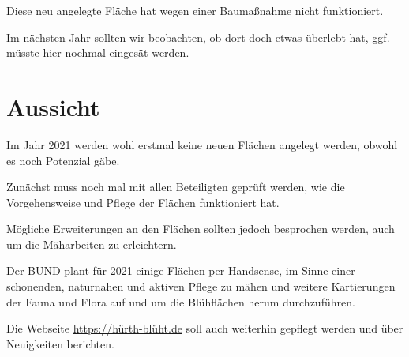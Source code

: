 \documentclass[10pt]{article}
\begin{document}
Diese neu angelegte Fläche hat wegen einer Baumaßnahme nicht funktioniert.

Im nächsten Jahr sollten wir beobachten, ob dort doch etwas überlebt hat, ggf. müsste hier nochmal eingesät werden.

\clearpage
\section{Aussicht}
Im Jahr 2021 werden wohl erstmal keine neuen Flächen angelegt werden, obwohl es noch Potenzial gäbe.

Zunächst muss noch mal mit allen Beteiligten geprüft werden, wie die Vorgehensweise und Pflege der Flächen funktioniert hat.

Mögliche Erweiterungen an den Flächen sollten jedoch besprochen werden, auch um die Mäharbeiten zu erleichtern.

Der BUND plant für 2021 einige Flächen per Handsense, im Sinne einer schonenden, naturnahen und aktiven Pflege  zu mähen und weitere Kartierungen der Fauna und Flora auf und um die Blühflächen herum durchzuführen.

Die Webseite \href{https://hürth-blüht.de}{https://hürth-blüht.de} soll auch weiterhin gepflegt werden und über Neuigkeiten berichten.
\end{document}
